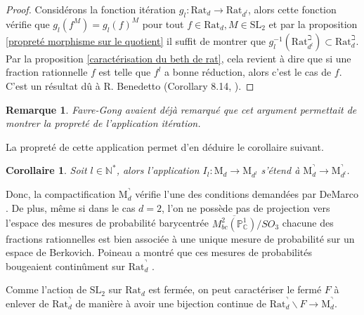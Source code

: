 \documentclass[11pt]{article}
\newcommand{\N}{\mathbb{N}}
\newcommand{\C}{\mathbb{C}}
\newcommand{\p}{\mathbb{P}}
\newcommand{\Rat}{\mathrm{Rat}}
\newcommand{\SL}{\mathrm{SL}}
\newcommand{\M}{\mathrm{M}}
\newtheorem{prop}[thm]{Proposition}
\newtheorem{rem}[thm]{Remarque}
\newtheorem{cor}[thm]{Corollaire}
\begin{document}
\begin{proof}
Considérons la fonction itération $g_l : \Rat_d \rightarrow \Rat_{d^l}$, alors cette fonction vérifie que $g_l (f^M) = g_l(f)^M$ pour tout $f\in \Rat_d, M\in \SL_2$ et par la proposition \ref{propreté morphisme sur le quotient} il suffit de montrer que $g_l^{-1}(\Rat_{d^l}^\beth) \subset \Rat_d^\beth$. Par la proposition \ref{caractérisation du beth de rat}, cela revient à dire que si une fraction rationnelle $f$ est telle que $f^l$ a bonne réduction, alors c'est le cas de $f$. C'est un résultat dû à R. Benedetto (Corollary 8.14, \cite{BenedettoLivre}).
\end{proof}

\begin{rem}
Favre-Gong avaient déjà remarqué que cet argument permettait de montrer la propreté de l'application itération.
\end{rem}

La propreté de cette application permet d'en déduire le corollaire suivant.

\begin{cor}\label{existence itération compactification}
Soit $l \in \N^*$, alors l'application $I_l : \M_d \rightarrow \M_{d^l}$ s'étend à $\M_d^\urcorner \rightarrow \M_{d^l}^\urcorner$. 
\end{cor}

Donc, la compactification $\M_d^\urcorner$ vérifie l'une des conditions demandées par DeMarco \cite{DeMarcoSpaceQuadraticRationalMaps}. De plus, même si dans le cas $d=2$, l'on ne possède pas de projection vers l'espace des mesures de probabilité barycentrée $\overline{M^2_{bc}(\p^1_\C)}/SO_3$ chacune des fractions rationnelles est bien associée à une unique mesure de probabilité sur un espace de Berkovich. Poineau a montré que ces mesures de probabilités bougeaient continûment sur $\Rat_d^\urcorner$ \cite{PoineauDynamique}. 


Comme l'action de $\SL_2$ sur $\Rat_d$ est fermée, on peut caractériser le fermé $F$ à enlever de $\Rat_d^\urcorner$ de manière à avoir une bijection continue de $\Rat_d^\urcorner \backslash F \rightarrow \M_d^\urcorner$. 

\end{document}
